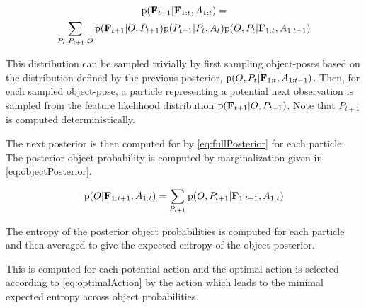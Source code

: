                 {\small
                \begin{multline}
                    \label{eq:evidenceDistribution}
                    \prob{\set{F}_{t+1}|\set{F}_{1:t}, A_{1:t}} = \\ \sum_{P_t,P_{t+1},O}  \prob{\set{F}_{t+1}|O,P_{t+1}} \prob{P_{t+1}|P_t,A_t} \prob{O,P_t|\set{F}_{1:t},A_{1:t-1}}
                \end{multline}
                }

%

                This distribution can be sampled trivially by first sampling object-poses based on the distribution defined by the previous posterior, $\text{p}(O,P_t|\mathbf{F}_{1:t},A_{1:t-1})$. Then, for each sampled object-pose, a particle representing a potential next observation is sampled from the feature likelihood distribution $\text{p}(\mathbf{F}_{t+1}|O,P_{t+1})$. Note that $P_{t+1}$ is computed deterministically.

                The next posterior is then computed for by \eqref{eq:fullPosterior} for each particle. The posterior object probability is computed by marginalization given in \eqref{eq:objectPosterior}.

                \begin{equation}
                    \label{eq:objectPosterior}
                    \prob{O|\set{F}_{1:t+1},A_{1:t}} = \sum_{P_{t+1}} \prob{O,P_{t+1}|\set{F}_{1:t+1},A_{1:t}}
                \end{equation}

                The entropy of the posterior object probabilities is computed for each particle and then averaged to give the expected entropy of the object posterior. 

                This is computed for each potential action and the optimal action is selected according to \eqref{eq:optimalAction} by the action which leads to the minimal expected entropy across object probabilities.
